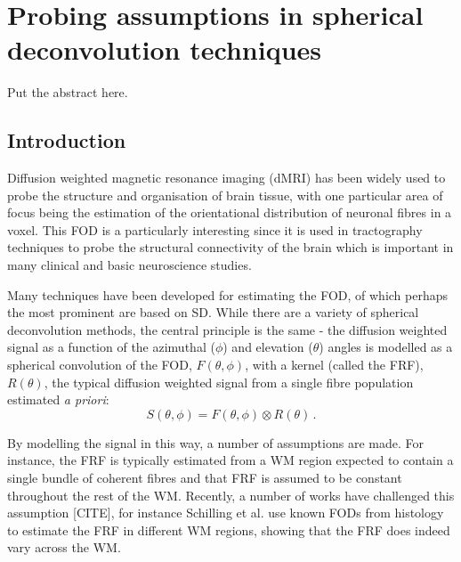 \chapter{Probing assumptions in spherical deconvolution techniques}
\label{chap:frf_experiment}

\chaptertoc{}

\begin{chapterabstract}
Put the abstract here.
\end{chapterabstract}


\section{Introduction}
\label{sec:frf_introduction}
Diffusion weighted magnetic resonance imaging (dMRI) has been widely used to probe the structure and organisation of brain tissue, with one particular area of focus being the estimation of the orientational distribution of neuronal fibres in a voxel. This \ac{FOD} is a particularly interesting since it is used in tractography techniques to probe the structural connectivity of the brain which is important in many clinical and basic neuroscience studies\cite{DellAcqua2019,Johansen-Berg2006,Catani2013}.


Many techniques have been developed for estimating the \acl{FOD}, of which perhaps the most prominent are based on \ac{SD}. While there are a variety of spherical deconvolution methods, the central principle is the same - the diffusion weighted signal as a function of the azimuthal ($\phi$) and elevation ($\theta$) angles is modelled as a spherical convolution of the \ac{FOD}, $F(\theta,\phi)$, with a kernel (called the \ac{FRF}), $R(\theta)$, the typical diffusion weighted signal from a single fibre population estimated \emph{a priori}:
\begin{equation}
  S(\theta, \phi) = F(\theta, \phi) \otimes R(\theta) \,.
  \label{eq:spherical_conv}
\end{equation}

By modelling the signal in this way, a number of assumptions are made. For instance, the \ac{FRF} is typically estimated from a \ac{WM} region expected to contain a single bundle of coherent fibres and that \ac{FRF} is assumed to be constant throughout the rest of the \ac{WM}.
Recently, a number of works have challenged this assumption [CITE], for instance Schilling et al. \cite{Schilling2019} use known \acs{FOD}s from histology to estimate the \ac{FRF} in different WM regions, showing that the \ac{FRF} does indeed vary across the \ac{WM}.

